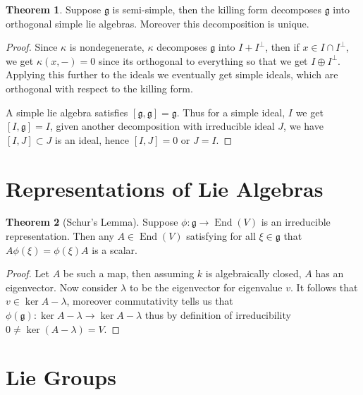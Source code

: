 \documentclass[10.5pt]{article}
\theoremstyle{definition}
\newtheorem{theorem}{Theorem}
\numberwithin{example}{subsection}
\numberwithin{proposition}{subsection}
\numberwithin{pb}{subsection}
\begin{document}
        \begin{theorem}
            Suppose \(\mathfrak{g}\) is semi-simple, then the killing form decomposes \(\mathfrak{g}\) into orthogonal simple lie algebras. Moreover this decomposition is unique.

            \begin{proof}
                Since \(\kappa\) is nondegenerate, \(\kappa\) decomposes \(\mathfrak{g}\) into \(I + I^\perp\), then if \(x \in I \cap I^\perp\), we get \(\kappa(x,-) = 0\) since its orthogonal to everything so that we get \(I \oplus I^\perp\). Applying this further to the ideals we eventually get simple ideals, which are orthogonal with respect to the killing form.

                A simple lie algebra satisfies \([\mathfrak{g},\mathfrak{g}] = \mathfrak{g}\). Thus for a simple ideal, \(I\) we get \([I,\mathfrak{g}] = I\), given another decomposition with irreducible ideal \(J\), we have \([I,J] \subset J\) is an ideal, hence \([I,J] = 0\) or \(J = I\).
            \end{proof}
        \end{theorem}

        \section{Representations of Lie Algebras}

        \begin{theorem}[Schur's Lemma]\label{schur}
            Suppose \(\phi: \mathfrak{g} \to \operatorname{End}(V)\) is an irreducible representation. Then any \(A \in \operatorname{End}(V)\) satisfying for all \(\xi \in \mathfrak{g}\) that \(A\phi(\xi) = \phi(\xi)A\) is a scalar.

            \begin{proof}
                Let \(A\) be such a map, then assuming \(k\) is algebraically closed, \(A\) has an eigenvector. Now consider \(\lambda\) to be the eigenvector for eigenvalue \(v\). It follows that \(v \in \ker A - \lambda\), moreover commutativity tells us that \(\phi(\mathfrak{g}): \ker A - \lambda \to \ker A - \lambda\) thus by definition of irreducibility \(0 \neq \ker (A - \lambda) = V\).
            \end{proof}  
        \end{theorem}

    \section{Lie Groups}
\end{document}
